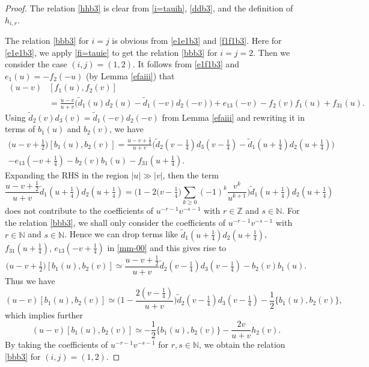 \documentclass[11pt,reqno]{amsart}
\numberwithin{equation}{section}
\theoremstyle{definition}
\theoremstyle{remark}
\newcommand{\beq}{\begin{equation}}
\newcommand{\eeq}{\end{equation}}
\newcommand{\bZ}{\mathbb{Z}}
\newcommand{\bN}{\mathbb{N}}
\newcommand{\tl}{\tilde}
\newcommand{\gge}{\geqslant}
\begin{document}
\begin{proof}
The relation \eqref{hhb3} is clear from \eqref{i=tauih}, \eqref{ddb3}, and the definition of $h_{i,r}$.

The relation \eqref{bbb3} for $i=j$ is obvious from \eqref{e1e1b3} and \eqref{f1f1b3}. Here for \eqref{e1e1b3}, we apply \eqref{fi=tauie} to get the relation \eqref{bbb3} for $i=j=2$. Then we consider the case $(i,j)=(1,2)$. It follows from \eqref{e1f1b3} and $e_1(u)=-f_2(-u)$ (by Lemma \ref{efaiii}) that
\begin{align*}
(u-v)&[f_1(u),f_2(v)]\\
&=\frac{u-v}{u+v}\big(\tl d_1(u)d_2(u)-\tl d_1(-v)d_2(-v)\big)+e_{13}(-v)-f_2(v)f_1(u)+f_{31}(u).
\end{align*}
Using $\tl d_2(v)d_3(v)=\tl d_1(-v)d_2(-v)$ from Lemma \ref{efaiii} and rewriting it in terms of $b_1(u)$ and $b_2(v)$, we have
\beq\label{mm-00}
\begin{split}
\big(u-v+\tfrac12\big)[b_1(u),b_2(v)]
=\frac{u-v+\frac12}{u+v}\Big(\tl d_2(v-\tfrac14)d_3(v-\tfrac14)-\tl d_1(u+\tfrac14)d_2(u+\tfrac14)\Big)\\-e_{13}(-v+\tfrac14)-b_2(v)b_1(u)-f_{31}(u+\tfrac14).
\end{split}
\eeq
Expanding the RHS in the region $|u|\gg |v|$, then the term
\beq\label{996}
\frac{u-v+\frac12}{u+v} \tl d_1(u+\tfrac14)d_2(u+\tfrac14)=\Big(1-2\big(v-\tfrac14\big)\sum_{k\gge 0}(-1)^k\frac{v^k}{u^{k+1}}\Big)\tl d_1(u+\tfrac14)d_2(u+\tfrac14)
\eeq
does not contribute to the coefficients of $u^{-r-1}v^{-s-1}$ with $r\in\bZ$ and $s\in \bN$. For the relation \eqref{bbb3}, we shall only consider the coefficients of $u^{-r-1}v^{-s-1}$ with $r\in\bN$ and $s\in \bN$. Hence we can drop terms like $\tl d_1(u+\tfrac14)d_2(u+\tfrac14)$, $f_{31}(u+\tfrac14)$, $e_{13}(-v+\tfrac14)$ in \eqref{mm-00} and this gives rise to
\[
\big(u-v+\tfrac12\big)[b_1(u),b_2(v)]\simeq \frac{u-v+\frac12}{u+v} \tl d_2(v-\tfrac14)d_3(v-\tfrac14)-b_2(v)b_1(u).
\]
Thus we have
\[
(u-v)[b_1(u),b_2(v)]\simeq\Big(1-\frac{2( v-\tfrac14)}{u+v}\Big)\tl d_2(v-\tfrac14)d_3(v-\tfrac14)-\frac{1}{2}\big\{b_{1}(u),b_2(v)\big\},
\]
which implies further
\[
(u-v)[b_1(u),b_2(v)]\simeq -\frac{1}{2}\big\{b_1(u),b_2(v)\big\}-\frac{2v}{u+v} h_2(v).
\]
By taking the coefficients of $u^{-r-1}v^{-s-1}$ for $r,s\in\bN$, we obtain the relation \eqref{bbb3} for $(i,j)=(1,2)$.


\end{proof}
\end{document}
